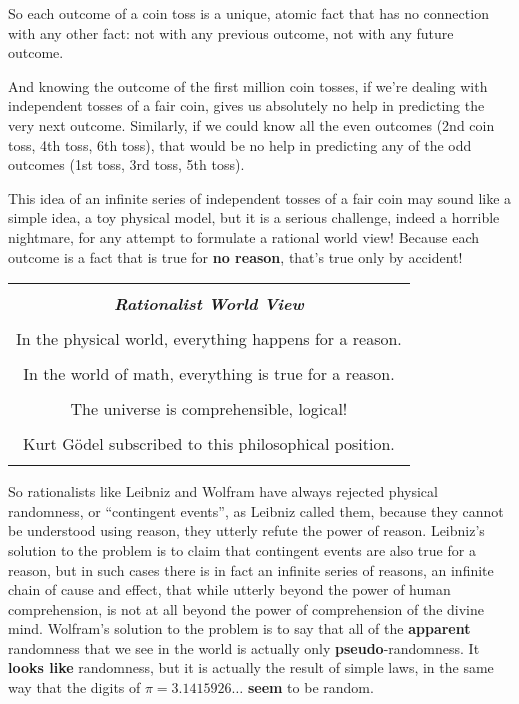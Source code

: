 \documentclass[12pt]{book}
\begin{document}
So each outcome of a coin toss is a unique, atomic fact that has no connection with any other
fact: not with any previous outcome, not with any future outcome.
 
And knowing the outcome of the first million coin tosses, if we're dealing with independent
tosses of a fair coin, gives us absolutely no help in predicting the very next outcome.
Similarly, if we could know all the even outcomes (2nd coin toss, 4th toss, 6th toss), that
would be no help in predicting any of the odd outcomes (1st toss, 3rd toss, 5th toss).
 
This idea of an infinite series of
independent tosses of a fair coin may sound like a simple idea, a toy physical
model, but it is a serious challenge, indeed a horrible nightmare,
for any attempt to formulate a rational world view!
Because each outcome is a fact that is true for \textbf{no reason}, that's true only by accident!
 
\begin{center}
\begin{tabular}{|c|}
\hline
\\
\textbf{\emph{\large Rationalist World View}}
\\ \\
In the physical world, everything happens for a reason.
\\ \\
In the world of math, everything is true for a reason.
\\ \\
The universe is comprehensible, logical!
\\ \\
Kurt G\"odel subscribed to this philosophical position.
\\
\\
\hline
\end{tabular}
\end{center}
 
So rationalists like Leibniz and Wolfram have always rejected physical randomness, or
``contingent events'', as Leibniz called them, because they cannot be understood using reason,
they utterly refute the power of reason. 
Leibniz's solution to the problem is to claim that contingent
events are also true for a reason, but in such cases 
there is in fact an infinite series of reasons, an infinite chain of cause and effect, that
while utterly beyond the power of human comprehension, 
is not at all beyond the power of comprehension of the divine mind.  Wolfram's solution to the
problem is to say that all of the \textbf{apparent} randomness 
that we see 
in the world is actually only \textbf{pseudo}-randomness.
It \textbf{looks like} randomness, but it is actually the result of simple laws, in the same
way that the digits of $\pi = 3.1415926\ldots$ \textbf{seem} to be random.
 
\end{document}
